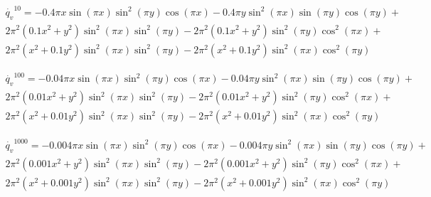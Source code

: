 \begin{multline}
\dot{q_v}^{10}=- 0.4 \pi x \sin{\left(\pi x \right)} \sin^{2}{\left(\pi y \right)} \cos{\left(\pi x \right)} - 0.4 \pi y \sin^{2}{\left(\pi x \right)} \sin{\left(\pi y \right)} \cos{\left(\pi y \right)} + \\2 \pi^{2} \left(0.1 x^{2} + y^{2}\right) \sin^{2}{\left(\pi x \right)} \sin^{2}{\left(\pi y \right)} - 2 \pi^{2} \left(0.1 x^{2} + y^{2}\right) \sin^{2}{\left(\pi y \right)} \cos^{2}{\left(\pi x \right)} + \\2 \pi^{2} \left(x^{2} + 0.1 y^{2}\right) \sin^{2}{\left(\pi x \right)} \sin^{2}{\left(\pi y \right)} - 2 \pi^{2} \left(x^{2} + 0.1 y^{2}\right) \sin^{2}{\left(\pi x \right)} \cos^{2}{\left(\pi y \right)}
\end{multline}

\begin{multline}
\dot{q_v}^{100}=- 0.04 \pi x \sin{\left(\pi x \right)} \sin^{2}{\left(\pi y \right)} \cos{\left(\pi x \right)} - 0.04 \pi y \sin^{2}{\left(\pi x \right)} \sin{\left(\pi y \right)} \cos{\left(\pi y \right)} + \\2 \pi^{2} \left(0.01 x^{2} + y^{2}\right) \sin^{2}{\left(\pi x \right)} \sin^{2}{\left(\pi y \right)} - 2 \pi^{2} \left(0.01 x^{2} + y^{2}\right) \sin^{2}{\left(\pi y \right)} \cos^{2}{\left(\pi x \right)} + \\2 \pi^{2} \left(x^{2} + 0.01 y^{2}\right) \sin^{2}{\left(\pi x \right)} \sin^{2}{\left(\pi y \right)} - 2 \pi^{2} \left(x^{2} + 0.01 y^{2}\right) \sin^{2}{\left(\pi x \right)} \cos^{2}{\left(\pi y \right)}
\end{multline}

\begin{multline}
\dot{q_v}^{1000}=- 0.004 \pi x \sin{\left(\pi x \right)} \sin^{2}{\left(\pi y \right)} \cos{\left(\pi x \right)} - 0.004 \pi y \sin^{2}{\left(\pi x \right)} \sin{\left(\pi y \right)} \cos{\left(\pi y \right)} +\\ 2 \pi^{2} \left(0.001 x^{2} + y^{2}\right) \sin^{2}{\left(\pi x \right)} \sin^{2}{\left(\pi y \right)} - 2 \pi^{2} \left(0.001 x^{2} + y^{2}\right) \sin^{2}{\left(\pi y \right)} \cos^{2}{\left(\pi x \right)} + \\2 \pi^{2} \left(x^{2} + 0.001 y^{2}\right) \sin^{2}{\left(\pi x \right)} \sin^{2}{\left(\pi y \right)} - 2 \pi^{2} \left(x^{2} + 0.001 y^{2}\right) \sin^{2}{\left(\pi x \right)} \cos^{2}{\left(\pi y \right)}
\end{multline}



